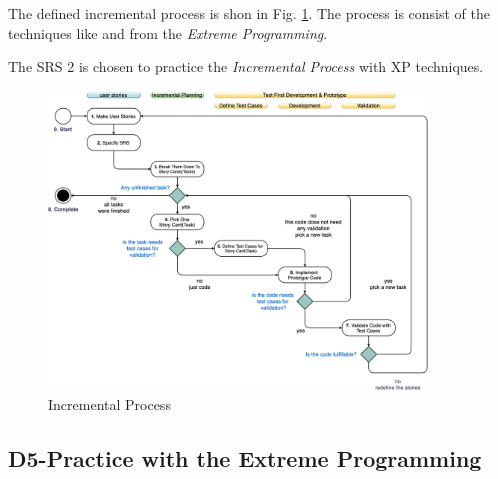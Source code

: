 \documentclass[transmag, conference, onecolumn]{IEEEtran}
\begin{document}
The defined incremental process is shon in Fig. \ref{fig:incre-process}.
The process is consist of the techniques like  and
 from the \textit{Extreme Programming}.

The SRS 2 is chosen to practice the \textit{Incremental Process} with XP techniques.

\begin{figure}[!ht]
	\centering
	\includegraphics[width=0.9\textwidth]{./img/f7-incremental-process.png}
	\caption{Incremental Process}
	\label{fig:incre-process}
\end{figure}

\subsection*{\textbf{D5-Practice with the Extreme Programming}}
\end{document}
